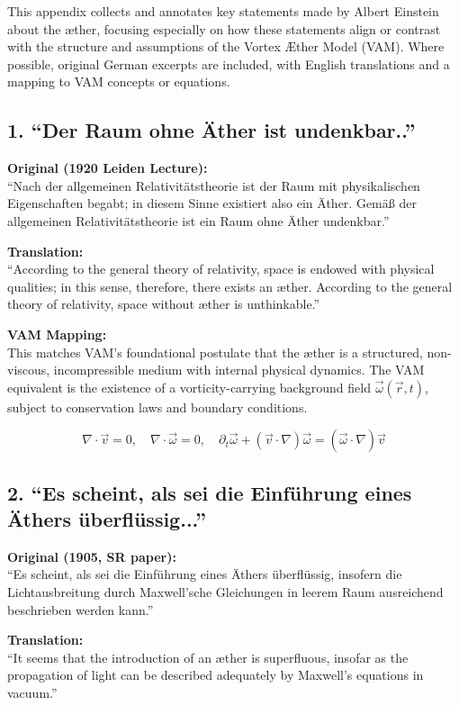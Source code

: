 This appendix collects and annotates key statements made by Albert Einstein about the æther, focusing especially on how these statements align or contrast with the structure and assumptions of the Vortex Æther Model (VAM). Where possible, original German excerpts are included, with English translations and a mapping to VAM concepts or equations.

\subsection*{1. ``Der Raum ohne Äther ist undenkbar..''}
\textbf{Original (1920 Leiden Lecture):} \\
``Nach der allgemeinen Relativitätstheorie ist der Raum mit physikalischen Eigenschaften begabt; in diesem Sinne existiert also ein Äther. Gemäß der allgemeinen Relativitätstheorie ist ein Raum ohne Äther undenkbar.''

\textbf{Translation:} \\
``According to the general theory of relativity, space is endowed with physical qualities; in this sense, therefore, there exists an æther. According to the general theory of relativity, space without æther is unthinkable.''

\textbf{VAM Mapping:} \\
This matches VAM's foundational postulate that the æther is a structured, non-viscous, incompressible medium with internal physical dynamics. The VAM equivalent is the existence of a vorticity-carrying background field \( \vec{\omega}(\vec{r}, t) \), subject to conservation laws and boundary conditions.

\[
\nabla \cdot \vec{v} = 0, \quad \nabla \cdot \vec{\omega} = 0, \quad \partial_t \vec{\omega} + (\vec{v} \cdot \nabla) \vec{\omega} = (\vec{\omega} \cdot \nabla) \vec{v}
\]

\subsection*{2. ``Es scheint, als sei die Einführung eines Äthers überflüssig...''}
\textbf{Original (1905, SR paper):} \\
``Es scheint, als sei die Einführung eines Äthers überflüssig, insofern die Lichtausbreitung durch Maxwell'sche Gleichungen in leerem Raum ausreichend beschrieben werden kann.''

\textbf{Translation:} \\
``It seems that the introduction of an æther is superfluous, insofar as the propagation of light can be described adequately by Maxwell's equations in vacuum.''

